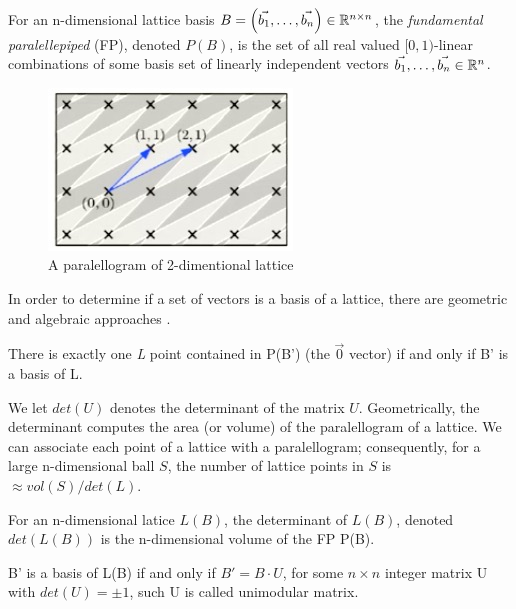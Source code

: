 \begin{definition}
  For an n-dimensional lattice basis
  $B = \left( \vec{b_1}, \dots, \vec{b_n} \right) \in \mathbb{R}^{n \times n}$, the
  \emph{fundamental paralellepiped} (FP), denoted $P(B)$, is the set of all real
  valued $[0,1)$-linear combinations of some basis set of linearly independent
  vectors $\vec{b_1}, \dots ,\vec{b_n} \in \mathbb{R}^n$.
  \begin{figure}[h]
    \centering \includegraphics[scale=0.7]{parallelopiped}
    \caption{A paralellogram of 2-dimentional lattice}
    \label{fig:paralellopiped}
  \end{figure}
\end{definition}
In order to determine if a set of vectors is a basis of a lattice, there are
geometric and algebraic approaches \cite{micciancio2009lattice}.
\begin{lemma}
  There is exactly one \emph{L} point contained in P(B') (the $\vec{0}$ vector)
  if and only if B' is a basis of L.
  \label{lem:parallelopiped}
\end{lemma}
We let $det(U)$ denotes the determinant of the matrix $U$.  Geometrically, the
determinant computes the area (or volume) of the paralellogram of a lattice. We
can associate each point of a lattice with a paralellogram; consequently, for a
large n-dimensional ball $S$, the number of lattice points in $S$ is
$\approx vol(S) / det(L)$.
\begin{definition}[Determinant]
  \label{def:determinant}
  For an n-dimensional latice $L(B)$, the determinant of $L(B)$, denoted
  $det(L(B))$ is the n-dimensional volume of the FP P(B).
\end{definition}

\begin{lemma}
  B' is a basis of L(B) if and only if $B'=B \cdot U$, for some $n \times n$ integer
  matrix U with $det(U) = \pm 1$, such U is called unimodular matrix.
  \label{lem:detBasis}
\end{lemma}

